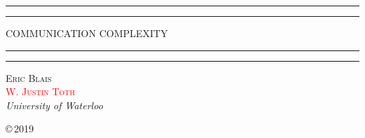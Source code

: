 \documentclass[11pt]{amsbook}
\theoremstyle{plain}
\theoremstyle{definition}
\theoremstyle{plain}
\newcommand{\replacethistext}[1]{\textcolor{red}{#1}}
\begin{document}
\begin{titlepage}
\centering
\scshape
\vspace*{\baselineskip}

\rule{\textwidth}{1.6pt}\vspace*{-\baselineskip}\vspace*{2pt}
\rule{\textwidth}{0.4pt}

\vspace{0.75\baselineskip}
    {\LARGE COMMUNICATION COMPLEXITY\\}
\vspace{0.75\baselineskip}

\rule{\textwidth}{0.4pt}\vspace*{-\baselineskip}\vspace{3.2pt}
\rule{\textwidth}{1.6pt}

\vspace{2\baselineskip}

{\scshape\Large Eric Blais \\
 \replacethistext{W. Justin Toth} \\}
\vspace{\baselineskip}
\textit{University of Waterloo}
	
\vfill

\copyright\,2019
\end{titlepage}


\frontmatter

\tableofcontents

\mainmatter



















\end{document}

